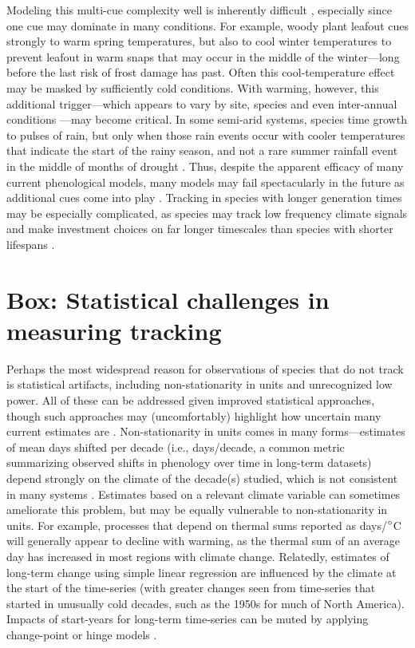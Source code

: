 \documentclass[11pt,letterpaper]{article}
\begin{document}
Modeling this multi-cue complexity well is inherently difficult \citep{chuine2016}, especially since one cue may dominate in many conditions. For example, woody plant leafout cues strongly to warm spring temperatures, but also to cool winter temperatures to prevent leafout in warm snaps that may occur in the middle of the winter---long before the last risk of frost damage has past. Often this cool-temperature effect may be masked by sufficiently cold conditions. With warming, however, this additional trigger---which appears to vary by site, species and even inter-annual conditions \citep{Burghardt2015}---may become critical. In some semi-arid systems, species time growth to pulses of rain, but only when those rain events occur with cooler temperatures that indicate the start of the rainy season, and not a rare summer rainfall event in the middle of months of drought \citep{Wainwright:2012tw,wainwright2013}. Thus, despite the apparent efficacy of many current phenological models, many models may fail spectacularly in the future as additional cues come into play \citep{dennis2003,chuine2016}. Tracking in species with longer generation times may be especially complicated, as species may track low frequency climate signals and make investment choices on far longer timescales than species with shorter lifespans \citep{morris2008}. 

\section{Box: Statistical challenges in measuring tracking}
Perhaps the most widespread reason for observations of species that do not track is statistical artifacts, including non-stationarity in units and unrecognized low power. All of these can be addressed given improved statistical approaches, though such approaches may (uncomfortably) highlight how uncertain many current estimates are \citep{brown2016}. Non-stationarity in units comes in many forms---estimates of mean days shifted per decade (i.e., days/decade, a common metric summarizing observed shifts in phenology over time in long-term datasets) depend strongly on the climate of the decade(s) studied, which is not consistent in many systems \citep{Ault2011,McCabe2012}. Estimates based on a relevant climate variable can sometimes ameliorate this problem, but may be equally vulnerable to non-stationarity in units. For example, processes that depend on thermal sums reported as days/$\degree$C will generally appear to decline with warming, as the thermal sum of an average day has increased in most regions with climate change. Relatedly, estimates of long-term change using simple linear regression are influenced by the climate at the start of the time-series (with greater changes seen from time-series that started in unusually cold decades, such as the 1950s for much of North America). Impacts of start-years for long-term time-series can be muted by applying change-point or hinge models \citep[e.g.,][]{kharouba2018}. 
\end{document}
